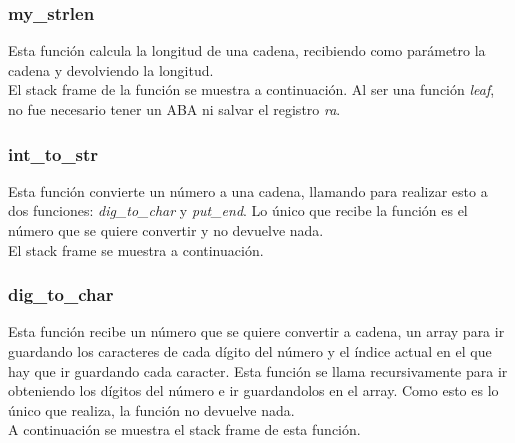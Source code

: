 \documentclass[a4paper,10pt]{article}
\begin{document}
\subsubsection{my\_strlen}
Esta función calcula la longitud de una cadena, recibiendo como parámetro la cadena y devolviendo la longitud. \\
El stack frame de la función se muestra a continuación. Al ser una función \textit{leaf}, no fue necesario tener un ABA ni salvar el registro \textit{ra}.
\begin{center}
\begin{drawstack}
	\startframe
	 
	 
\end{drawstack}
\end{center}

\subsubsection{int\_to\_str}
Esta función convierte un número a una cadena, llamando para realizar esto a dos funciones: \textit{dig\_to\_char} y \textit{put\_end}. Lo único que recibe la función es el número que se quiere convertir y no devuelve nada. \\
El stack frame se muestra a continuación.

\begin{center}
\begin{drawstack}
	\startframe
	 
	 
	 
	 
	\startframe
	 
	 
	\startframe
	 
	 
	 
	 
\end{drawstack}
\end{center}

\subsubsection{dig\_to\_char}
Esta función recibe un número que se quiere convertir a cadena, un array para ir guardando los caracteres de cada dígito del número y el índice actual en el que hay que ir guardando cada caracter. Esta función se llama recursivamente para ir obteniendo los dígitos del número e ir guardandolos en el array. Como esto es lo único que realiza, la función no devuelve nada. \\
A continuación se muestra el stack frame de esta función.
\end{document}
